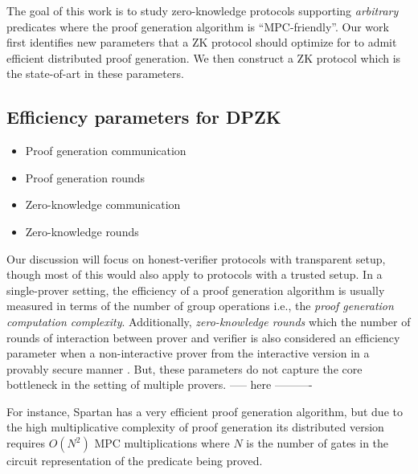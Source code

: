 The goal of this work is to study zero-knowledge protocols supporting \textit{arbitrary} predicates where the proof generation algorithm is ``MPC-friendly''. %
Our work first identifies new parameters that a ZK protocol should optimize for to admit efficient distributed proof generation. We then construct a ZK protocol which is the state-of-art in these parameters.

\subsection{Efficiency parameters for DPZK}
\begin{itemize}
\item Proof generation communication
\item Proof generation rounds
\item Zero-knowledge communication
\item Zero-knowledge rounds
\end{itemize}

Our discussion will focus on honest-verifier protocols with transparent setup, though most of this would also apply to protocols with a trusted setup. %
In a single-prover setting, the efficiency of a proof generation algorithm is usually measured in terms of the number of group operations i.e., the \textit{proof generation computation complexity}. Additionally, \textit{zero-knowledge rounds} which the number of rounds of interaction between prover and verifier is also considered an efficiency parameter when a non-interactive prover from the interactive version in a provably secure manner \cite{BCS16}. But, these parameters do not capture the core bottleneck in the setting of multiple provers. 
----- here ----------

For instance, Spartan \cite{spartan} has a very efficient proof generation algorithm, but due to the high multiplicative complexity of proof generation its distributed version requires $O(N^2)$ MPC multiplications where $N$ is the number of gates in the circuit representation of the predicate being proved. %

